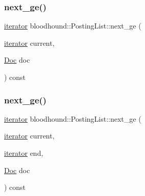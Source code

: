 \mbox{\label{classbloodhound_1_1PostingList_abd082192a0339062d318de73c95f1ee5}} 
\subsubsection{\texorpdfstring{next\+\_\+ge()}{next\_ge()}\hspace{0.1cm}{\footnotesize\ttfamily [1/2]}}
{\footnotesize\ttfamily \hyperlink{structbloodhound_1_1PostingList_1_1iterator}{iterator} bloodhound\+::\+Posting\+List\+::next\+\_\+ge (\begin{DoxyParamCaption}\item[{\hyperlink{structbloodhound_1_1PostingList_1_1iterator}{iterator}}]{current,  }\item[{\hyperlink{structbloodhound_1_1Doc}{Doc}}]{doc }\end{DoxyParamCaption}) const\hspace{0.3cm}{\ttfamily [inline]}}

\mbox{\label{classbloodhound_1_1PostingList_aae5c35208d6fb36f611f952ba57add0f}} 
\subsubsection{\texorpdfstring{next\+\_\+ge()}{next\_ge()}\hspace{0.1cm}{\footnotesize\ttfamily [2/2]}}
{\footnotesize\ttfamily \hyperlink{structbloodhound_1_1PostingList_1_1iterator}{iterator} bloodhound\+::\+Posting\+List\+::next\+\_\+ge (\begin{DoxyParamCaption}\item[{\hyperlink{structbloodhound_1_1PostingList_1_1iterator}{iterator}}]{current,  }\item[{\hyperlink{structbloodhound_1_1PostingList_1_1iterator}{iterator}}]{end,  }\item[{\hyperlink{structbloodhound_1_1Doc}{Doc}}]{doc }\end{DoxyParamCaption}) const\hspace{0.3cm}{\ttfamily [inline]}}


